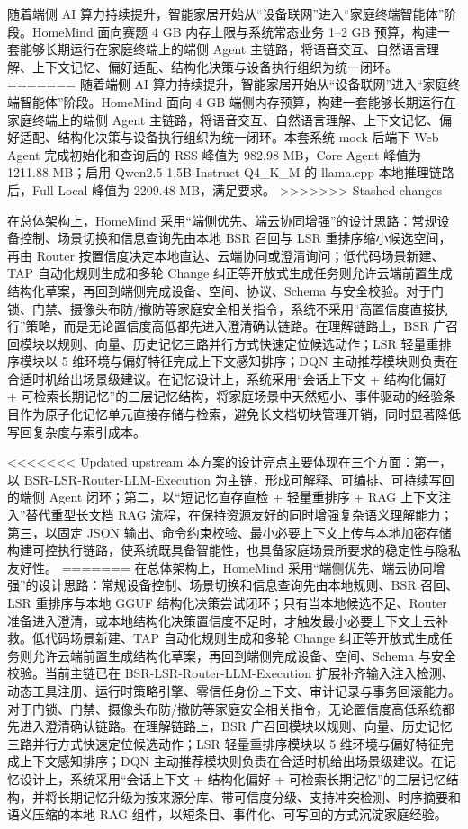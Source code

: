 \documentclass[12pt,a4paper,oneside]{ctexrep}
\begin{document}
随着端侧 AI 算力持续提升，智能家居开始从“设备联网”进入“家庭终端智能体”阶段。HomeMind 面向赛题 4 GB 内存上限与系统常态业务 1--2 GB 预算，构建一套能够长期运行在家庭终端上的端侧 Agent 主链路，将语音交互、自然语言理解、上下文记忆、偏好适配、结构化决策与设备执行组织为统一闭环。
=======
\indent 随着端侧 AI 算力持续提升，智能家居开始从“设备联网”进入“家庭终端智能体”阶段。HomeMind 面向 4 GB 端侧内存预算，构建一套能够长期运行在家庭终端上的端侧 Agent 主链路，将语音交互、自然语言理解、上下文记忆、偏好适配、结构化决策与设备执行组织为统一闭环。本套系统 mock 后端下 Web Agent 完成初始化和查询后的 RSS 峰值为 982.98 MB，Core Agent 峰值为 1211.88 MB；启用 Qwen2.5-1.5B-Instruct-Q4\_K\_M 的 llama.cpp 本地推理链路后，Full Local 峰值为 2209.48 MB，满足要求。
>>>>>>> Stashed changes

在总体架构上，HomeMind 采用“端侧优先、端云协同增强”的设计思路：常规设备控制、场景切换和信息查询先由本地 BSR 召回与 LSR 重排序缩小候选空间，再由 Router 按置信度决定本地直达、云端协同或澄清询问；低代码场景新建、TAP 自动化规则生成和多轮 Change 纠正等开放式生成任务则允许云端前置生成结构化草案，再回到端侧完成设备、空间、协议、Schema 与安全校验。对于门锁、门禁、摄像头布防/撤防等家庭安全相关指令，系统不采用“高置信度直接执行”策略，而是无论置信度高低都先进入澄清确认链路。在理解链路上，BSR 广召回模块以规则、向量、历史记忆三路并行方式快速定位候选动作；LSR 轻量重排序模块以 5 维环境与偏好特征完成上下文感知排序；DQN 主动推荐模块则负责在合适时机给出场景级建议。在记忆设计上，系统采用“会话上下文 + 结构化偏好 + 可检索长期记忆”的三层记忆结构，将家庭场景中天然短小、事件驱动的经验条目作为原子化记忆单元直接存储与检索，避免长文档切块管理开销，同时显著降低写回复杂度与索引成本。

<<<<<<< Updated upstream
本方案的设计亮点主要体现在三个方面：第一，以 BSR-LSR-Router-LLM-Execution 为主链，形成可解释、可编排、可持续写回的端侧 Agent 闭环；第二，以“短记忆直存直检 + 轻量重排序 + RAG 上下文注入”替代重型长文档 RAG 流程，在保持资源友好的同时增强复杂语义理解能力；第三，以固定 JSON 输出、命令约束校验、最小必要上下文上传与本地加密存储构建可控执行链路，使系统既具备智能性，也具备家庭场景所要求的稳定性与隐私友好性。
=======
在总体架构上，HomeMind 采用“端侧优先、端云协同增强”的设计思路：常规设备控制、场景切换和信息查询先由本地规则、BSR 召回、LSR 重排序与本地 GGUF 结构化决策尝试闭环；只有当本地候选不足、Router 准备进入澄清，或本地结构化决策置信度不足时，才触发最小必要上下文上云补救。低代码场景新建、TAP 自动化规则生成和多轮 Change 纠正等开放式生成任务则允许云端前置生成结构化草案，再回到端侧完成设备、空间、Schema 与安全校验。当前主链已在 BSR-LSR-Router-LLM-Execution 扩展补齐输入注入检测、动态工具注册、运行时策略引擎、零信任身份上下文、审计记录与事务回滚能力。对于门锁、门禁、摄像头布防/撤防等家庭安全相关指令，无论置信度高低系统都先进入澄清确认链路。在理解链路上，BSR 广召回模块以规则、向量、历史记忆三路并行方式快速定位候选动作；LSR 轻量重排序模块以 5 维环境与偏好特征完成上下文感知排序；DQN 主动推荐模块则负责在合适时机给出场景级建议。在记忆设计上，系统采用“会话上下文 + 结构化偏好 + 可检索长期记忆”的三层记忆结构，并将长期记忆升级为按来源分库、带可信度分级、支持冲突检测、时序摘要和语义压缩的本地 RAG 组件，以短条目、事件化、可写回的方式沉淀家庭经验。
\end{document}
